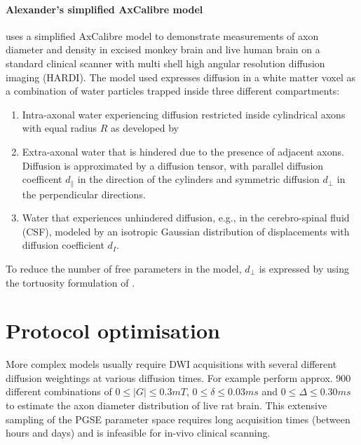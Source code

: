 \paragraph*{Alexander's simplified AxCalibre model} 
\label{par:alexanders_model}
\citet{Alexander:2010} uses a simplified AxCalibre model to demonstrate measurements of axon diameter and density in excised monkey brain and live human brain on a standard clinical scanner with multi shell high angular resolution diffusion imaging (HARDI). The model used expresses diffusion in a white matter voxel as a combination of water particles trapped inside three different compartments: 
\begin{enumerate}
  \item Intra-axonal water experiencing diffusion restricted inside cylindrical axons with equal radius $R$ as developed by \citet{Gelderen:1994}
  \item Extra-axonal water that is hindered due to the presence of adjacent axons. Diffusion is approximated by a diffusion tensor, with parallel diffusion coefficent $d_\parallel$ in the direction of the cylinders and symmetric diffusion $d_\perp$ in the perpendicular directions.
  \item Water that experiences unhindered diffusion, e.g., in the cerebro-spinal fluid (CSF), modeled by an isotropic Gaussian distribution of displacements with diffusion coefficient $d_{I}$.
\end{enumerate}
To reduce the number of free parameters in the model, $d_\perp$ is expressed by using the tortuosity formulation of \citet{Szafer:1995}.

\section{Protocol optimisation}
\label{sec:protocol_optimisation}
More complex models usually require DWI acquisitions with several different diffusion weightings at various diffusion times. For example \citet{Barazany:2009} perform approx. 900 different combinations of $0\le|G|\le 0.3mT$, $0\le \delta \le 0.03ms$ and $0\le \Delta \le 0.30ms$ to estimate the axon diameter distribution of live rat brain. This extensive sampling of the PGSE parameter space requires long acquisition times (between hours and days) and is infeasible for in-vivo clinical scanning. 

